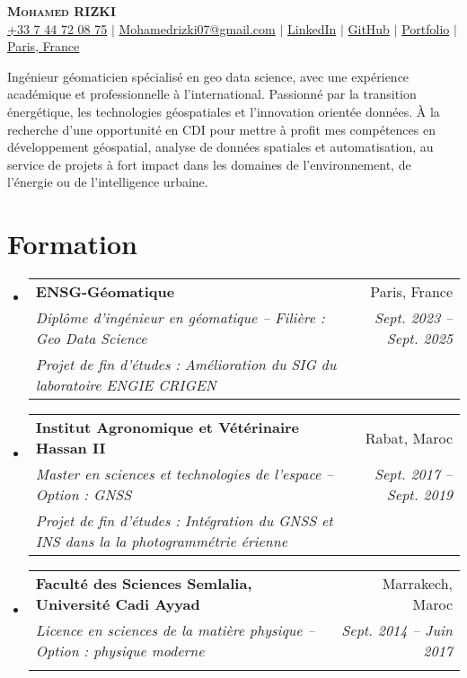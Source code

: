 \documentclass[letterpaper,11pt]{article}
\makeatletter
\newcommand{\resumeEducationHeading}[6]{
  \vspace{-2pt}\item
    \begin{tabular*}{0.97\textwidth}[t]{l@{\extracolsep{\fill}}r}
      \textbf{#1} & #2 \\
      \textit{\small#3} & \textit{\small #4} \\
      \textit{\small#5} & \textit{\small #6} \\
    \end{tabular*}\vspace{-5pt}
}
\newcommand{\resumeSubHeadingListStart}{\begin{itemize}[leftmargin=0.15in, label={}]}
\newcommand{\resumeSubHeadingListEnd}{\end{itemize}}
\makeatother
\begin{document}
\begin{center}
    \textbf{\Huge \scshape Mohamed RIZKI} \\ \vspace{3pt}
    \small
    \faMobile \hspace{.5pt} \href{tel:33744720875}{+33 7 44 72 08 75}
    $|$
    \faAt \hspace{.5pt} \href{mailto:Mohamedrizki07@gmail.com}{Mohamedrizki07@gmail.com}
    $|$
    \faLinkedinSquare \hspace{.5pt} \href{https://www.linkedin.com/in/mohamed-rizki-979b03104/}{LinkedIn}
    $|$
    \faGithub \hspace{.5pt} \href{https://github.com/MohamedRizki}{GitHub}
    $|$
    \faGlobe \hspace{.5pt} \href{https://mohamedrizki.github.io/Portfolio-Mohamed-RIZKI/}{Portfolio}
    $|$
     \faMapMarker \hspace{.5pt} \href{https://www.google.com/maps/place/Paris,+France/@48.8566,2.3522,15z}{Paris, France}
\end{center}


Ingénieur géomaticien spécialisé en geo data science, avec une expérience académique et professionnelle à l'international. Passionné par la transition énergétique, les technologies géospatiales et l'innovation orientée données. À la recherche d'une opportunité en CDI pour mettre à profit mes compétences en développement géospatial, analyse de données spatiales et automatisation, au service de projets à fort impact dans les domaines de l’environnement, de l’énergie ou de l’intelligence urbaine.

\section{Formation}
\vspace{3pt}
\resumeSubHeadingListStart

  \resumeEducationHeading
    {ENSG-Géomatique}{Paris, France}
    {Diplôme d’ingénieur en géomatique – Filière : Geo Data Science}{Sept. 2023 -- Sept. 2025}
    {Projet de fin d’études : Amélioration du SIG du laboratoire ENGIE CRIGEN}{}

  \resumeEducationHeading
    {Institut Agronomique et Vétérinaire Hassan II}{Rabat, Maroc}
    {Master en sciences et technologies de l'espace – Option : GNSS}{Sept. 2017 -- Sept. 2019}
    {Projet de fin d’études : Intégration du GNSS et INS dans la la photogrammétrie érienne}{}

  \resumeEducationHeading
    {Faculté des Sciences Semlalia, Université Cadi Ayyad}{Marrakech, Maroc}
    {Licence en sciences de la matière physique – Option : physique moderne}{Sept. 2014 -- Juin 2017}
    {}{}
\resumeSubHeadingListEnd
\end{document}
